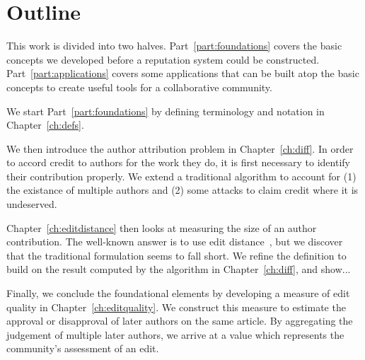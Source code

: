 \section{Outline}

This work is divided into two halves.
Part~\ref{part:foundations} covers the basic concepts we developed
before a reputation system could be constructed.
Part~\ref{part:applications} covers some applications that can
be built atop the basic concepts to create useful tools for
a collaborative community.

We start Part~\ref{part:foundations}
by defining terminology and notation in Chapter~\ref{ch:defs}.

We then introduce the author attribution problem in Chapter~\ref{ch:diff}.
In order to accord credit to authors for the work they do,
it is first necessary to identify their contribution properly.
We extend a traditional  algorithm to
account for (1) the existance of multiple authors and (2) some attacks
to claim credit where it is undeserved.

Chapter~\ref{ch:editdistance} then looks at measuring the size of
an author contribution.
The well-known answer is to use edit distance~\cite{Levenshtein66},
but we discover that the traditional formulation seems to fall short.
We refine the definition to build on the result computed by the
algorithm in Chapter~\ref{ch:diff}, and show...

Finally, we conclude the foundational elements by developing a measure
of edit quality in Chapter~\ref{ch:editquality}.
We construct this measure to estimate the approval or disapproval of
later authors on the same article.
By aggregating the judgement of multiple later authors, we arrive at
a value which represents the community's assessment of an edit.

